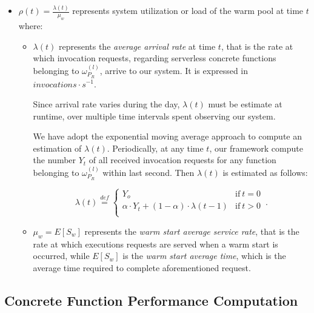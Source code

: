 \documentclass[12pt,a4paper]{report}
\newcommand{\mathDef}{\overset{\textit{def}}{=}}
\theoremstyle{definition}
\begin{document}
\begin{itemize}
	
	\item $\displaystyle \rho(t) = \frac{\lambda(t)}{\mu_{w}}$ represents system utilization or load of the warm pool at time $t$ where:
	
	\begin{itemize}
		
		\item $\lambda(t)$ represents the \textit{average arrival rate} at time $t$, that is the rate at which invocation requests, regarding serverless concrete functions belonging to $\omega_{P_R}^{(l)}$, arrive to our system. It is expressed in $invocations \cdot s^{-1}$.
				
		Since arrival rate varies during the day, $\lambda(t)$ must be estimate at runtime, over multiple time intervals spent observing our system.
		
		We have adopt the exponential moving average approach to compute an estimation of $\lambda(t)$. Periodically, at any time $t$, our framework compute the number $Y_t$ of all received invocation requests for any function belonging to $\omega_{P_R}^{(l)}$ within last second. Then $\lambda(t)$ is estimated as follows:
		
		\begin{equation}
			\lambda(t) \mathDef
			\begin{cases}
				Y_o & \text{if}\ t = 0\\ 
				\alpha \cdot Y_t + (1 - \alpha) \cdot \lambda(t-1) & \text{if}\ t > 0\\
				
			\end{cases}\,.
		\end{equation}
		
		\item $\mu_{w} = E[S_w]$ represents the \textit{warm start average service rate}, that is the rate at which executions requests are served when a warm start is occurred, while $E[S_w]$ is the \textit{warm start average time}, which is the average time required to complete aforementioned request.
		
	\end{itemize}
	
\end{itemize}


\subsection{Concrete Function Performance Computation}
\end{document}
